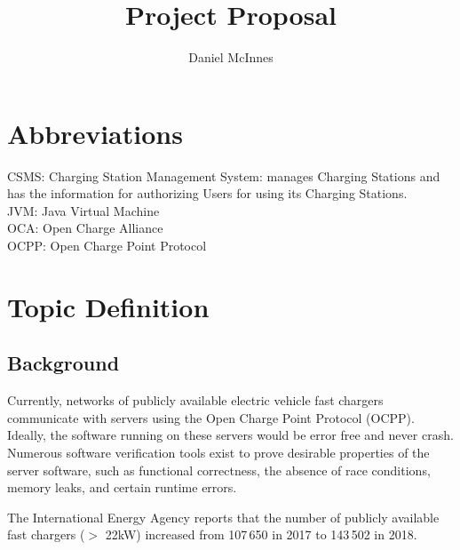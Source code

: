 \documentclass[11pt]{article}
\title{\textbf{Project Proposal}}
\author{Daniel McInnes}
\date{}
\begin{document}
\maketitle

\section{Abbreviations}
CSMS: Charging Station Management System: manages Charging Stations and has the information for authorizing
Users for using its Charging Stations.\\
JVM: Java Virtual Machine \\
OCA: Open Charge Alliance\\
OCPP: Open Charge Point Protocol\\
\section{Topic Definition}

\subsection{Background}
Currently, networks of publicly available electric vehicle fast chargers communicate with servers using the Open Charge Point Protocol (OCPP). Ideally, the software running on these servers would be error free and never crash. Numerous software verification tools exist to prove desirable properties of the server software, such as functional correctness, the absence of race conditions, memory leaks, and certain runtime errors. 

The International Energy Agency \cite{GlobalEVOutlook2019} reports that the number of publicly available fast chargers ($>$ 22kW) increased from 107\,650 in 2017 to 143\,502 in 2018.\\

\end{document}
